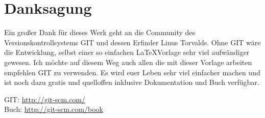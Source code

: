 \chapter*{Danksagung}
Ein großer Dank für dieses Werk geht an die Community des Versionskontrollsystems GIT und dessen Erfinder Linus Torvalds. Ohne GIT wäre die Entwicklung, selbst einer so einfachen \LaTeX Vorlage sehr viel aufwändiger gewesen. Ich möchte auf diesem Weg auch allen die mit dieser Vorlage arbeiten empfehlen GIT zu verwenden. Es wird euer Leben sehr viel einfacher machen und ist noch dazu gratis und quelloffen inklusive Dokumentation und Buch verfügbar.
\begin{center}
GIT: \url{http://git-scm.com/} \\
Buch: \url{http://git-scm.com/book}
        \tagmcend
\tagstructend
\end{center}
\newpage
